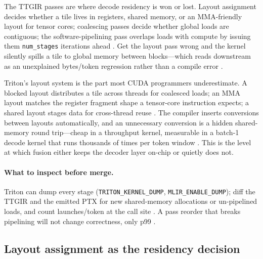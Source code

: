 The TTGIR passes are where decode residency is won or lost. Layout assignment decides whether a tile lives in registers, shared memory, or an MMA-friendly layout for tensor cores; coalescing passes decide whether global loads are contiguous; the software-pipelining pass overlaps loads with compute by issuing them \texttt{num\_stages} iterations ahead \citep{tritonlang2024,semianalysis2024tma}. Get the layout pass wrong and the kernel silently spills a tile to global memory between blocks---which reads downstream as an unexplained bytes/token regression rather than a compile error \citep{memoryfloor2026,taxbreak2026}.

Triton's layout system is the part most CUDA programmers underestimate. A blocked layout distributes a tile across threads for coalesced loads; an MMA layout matches the register fragment shape a tensor-core instruction expects; a shared layout stages data for cross-thread reuse \citep{tritonlang2024}. The compiler inserts conversions between layouts automatically, and an unnecessary conversion is a hidden shared-memory round trip---cheap in a throughput kernel, measurable in a batch-1 decode kernel that runs thousands of times per token window \citep{taxbreak2026,semianalysis2024tma}. This is the level at which fusion either keeps the decoder layer on-chip or quietly does not.

\paragraph{What to inspect before merge.} Triton can dump every stage (\texttt{TRITON\_KERNEL\_DUMP}, \texttt{MLIR\_ENABLE\_DUMP}); diff the TTGIR and the emitted PTX for new shared-memory allocations or un-pipelined loads, and count launches/token at the call site \citep{tritonlang2024,nvidia2024cudagraphs}. A pass reorder that breaks pipelining will not change correctness, only p99 \citep{patel2025llminference}.

\subsection{Layout assignment as the residency decision}

